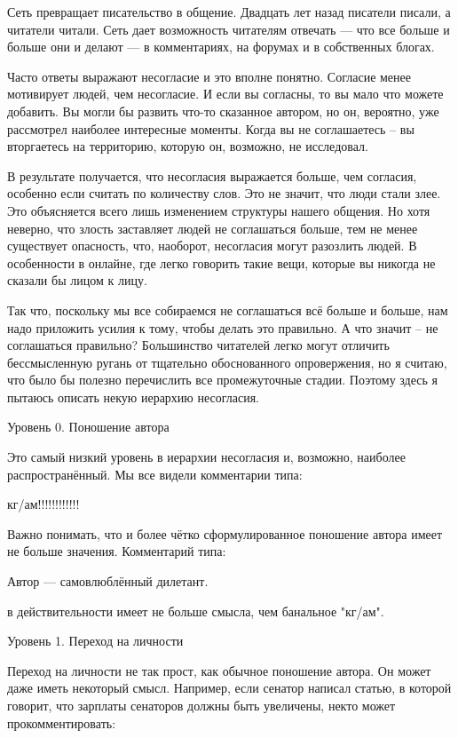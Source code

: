 \documentclass[ebook,12pt,oneside,openany]{memoir}
\date{}
\begin{document}
\maketitle

Сеть превращает писательство в общение. Двадцать лет назад писатели
писали, а читатели читали. Сеть дает возможность читателям отвечать —
что все больше и больше они и делают — в комментариях, на форумах и в
собственных блогах.

Часто ответы выражают несогласие и это вполне понятно. Согласие менее
мотивирует людей, чем несогласие. И если вы согласны, то вы мало что
можете добавить. Вы могли бы развить что-то сказанное автором, но он,
вероятно, уже рассмотрел наиболее интересные моменты. Когда вы не
соглашаетесь -- вы вторгаетесь на территорию, которую он, возможно, не
исследовал.

В результате получается, что несогласия выражается больше, чем
согласия, особенно если считать по количеству слов. Это не значит, что
люди стали злее. Это объясняется всего лишь изменением структуры
нашего общения. Но хотя неверно, что злость заставляет людей не
соглашаться больше, тем не менее существует опасность, что, наоборот,
несогласия могут разозлить людей. В особенности в онлайне, где легко
говорить такие вещи, которые вы никогда не сказали бы лицом к лицу.

Так что, поскольку мы все собираемся не соглашаться всё больше и
больше, нам надо приложить усилия к тому, чтобы делать это правильно.
А что значит -- не соглашаться правильно? Большинство читателей легко
могут отличить бессмысленную ругань от тщательно обоснованного
опровержения, но я считаю, что было бы полезно перечислить все
промежуточные стадии. Поэтому здесь я пытаюсь описать некую иерархию
несогласия.

Уровень 0. Поношение автора

Это самый низкий уровень в иерархии несогласия и, возможно, наиболее
распространённый. Мы все видели комментарии типа:

кг/ам!!!!!!!!!!!!

Важно понимать, что и более чётко сформулированное поношение автора
имеет не больше значения. Комментарий типа:

Автор — самовлюблённый дилетант.

в действительности имеет не больше смысла, чем банальное "кг/ам".

Уровень 1. Переход на личности

Переход на личности не так прост, как обычное поношение автора. Он
может даже иметь некоторый смысл. Например, если сенатор написал
статью, в которой говорит, что зарплаты сенаторов должны быть
увеличены, некто может прокомментировать:
\end{document}
